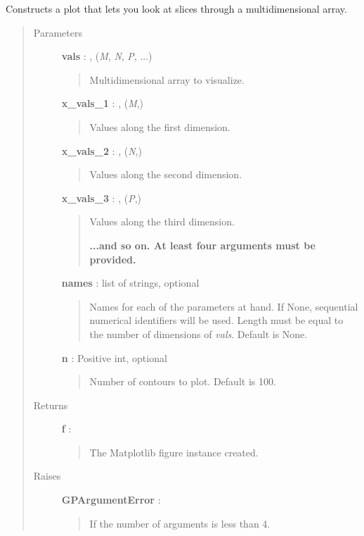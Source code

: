 \documentclass[letterpaper,10pt,english]{sphinxmanual}
\begin{document}

\begin{fulllineitems}
\label{gptools:gptools.utils.slice_plot}
Constructs a plot that lets you look at slices through a multidimensional array.
\begin{quote}\begin{description}
\item[{Parameters }] \leavevmode
\textbf{vals} : , (\emph{M}, \emph{N}, \emph{P}, ...)
\begin{quote}

Multidimensional array to visualize.
\end{quote}

\textbf{x\_vals\_1} : , (\emph{M},)
\begin{quote}

Values along the first dimension.
\end{quote}

\textbf{x\_vals\_2} : , (\emph{N},)
\begin{quote}

Values along the second dimension.
\end{quote}

\textbf{x\_vals\_3} : , (\emph{P},)
\begin{quote}

Values along the third dimension.

\textbf{...and so on. At least four arguments must be provided.}
\end{quote}

\textbf{names} : list of strings, optional
\begin{quote}

Names for each of the parameters at hand. If None, sequential numerical
identifiers will be used. Length must be equal to the number of
dimensions of \emph{vals}. Default is None.
\end{quote}

\textbf{n} : Positive int, optional
\begin{quote}

Number of contours to plot. Default is 100.
\end{quote}

\item[{Returns }] \leavevmode
\textbf{f} : 
\begin{quote}

The Matplotlib figure instance created.
\end{quote}

\item[{Raises }] \leavevmode
\textbf{GPArgumentError} :
\begin{quote}

If the number of arguments is less than 4.
\end{quote}

\end{description}\end{quote}

\end{fulllineitems}
\end{document}
